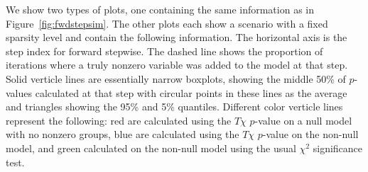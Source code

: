 \documentclass{imsart}
\begin{document}
We show two types of plots, one containing the same information as in
Figure~\ref{fig:fwdstepsim}. The other plots each show a scenario with
a fixed sparsity level and contain the following information. The
horizontal axis is the step index for forward stepwise. The dashed
line shows the proportion of iterations where a truly nonzero variable
was added to the model at that step. Solid verticle lines are essentially
narrow boxplots, showing the middle 50\% of $p$-values calculated at that
step with circular points in these lines as the average and triangles
showing the 95\% and 5\% quantiles. Different color verticle lines
represent the following: red are calculated using the $T\chi$ $p$-value
on a null model with no nonzero groups, blue are calculated using the
$T\chi$ $p$-value on the non-null model, and green calculated on the
non-null model using the usual $\chi^2$ significance test.
\end{document}
